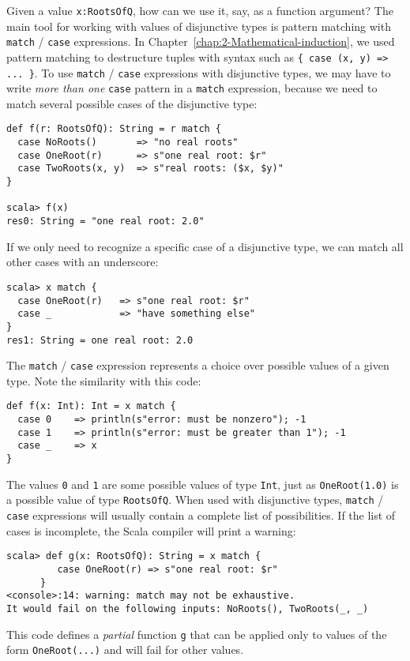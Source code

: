 Given a value \lstinline!x:RootsOfQ!, how can we use it, say, as
a function argument? The main tool for working with values of disjunctive
types is pattern matching with \lstinline!match! / \lstinline!case!
expressions. In Chapter~\ref{chap:2-Mathematical-induction}, we
used pattern matching to destructure tuples with syntax such as \lstinline!{ case (x, y) => ... }!.
To use \lstinline!match! / \lstinline!case! expressions with disjunctive
types, we may have to write \emph{more than one} \lstinline!case!
pattern in a \lstinline!match! expression, because we need to match
several possible cases of the disjunctive type:
\begin{lstlisting}
def f(r: RootsOfQ): String = r match {
  case NoRoots()       => "no real roots"
  case OneRoot(r)      => s"one real root: $r"
  case TwoRoots(x, y)  => s"real roots: ($x, $y)"
}

scala> f(x)
res0: String = "one real root: 2.0"
\end{lstlisting}
If we only need to recognize a specific case of a disjunctive type,
we can match all other cases with an underscore:
\begin{lstlisting}
scala> x match {
  case OneRoot(r)   => s"one real root: $r"
  case _            => "have something else"
}
res1: String = one real root: 2.0
\end{lstlisting}
The \lstinline!match! / \lstinline!case! expression represents a
choice over possible values of a given type. Note the similarity with
this code:

\begin{lstlisting}
def f(x: Int): Int = x match {
  case 0    => println(s"error: must be nonzero"); -1
  case 1    => println(s"error: must be greater than 1"); -1
  case _    => x
}
\end{lstlisting}
The values \lstinline!0! and \lstinline!1! are some possible values
of type \lstinline!Int!, just as \lstinline!OneRoot(1.0)! is a possible
value of type \lstinline!RootsOfQ!. When used with disjunctive types,
\lstinline!match! / \lstinline!case! expressions will usually contain
a complete list of possibilities. If the list of cases is incomplete,
the Scala compiler will print a warning:
\begin{lstlisting}
scala> def g(x: RootsOfQ): String = x match {
         case OneRoot(r) => s"one real root: $r"
      }
<console>:14: warning: match may not be exhaustive.
It would fail on the following inputs: NoRoots(), TwoRoots(_, _)
\end{lstlisting}
This code defines a \emph{partial} function
\lstinline!g! that can be applied only to values of the form \lstinline!OneRoot(...)!
and will fail for other values.

